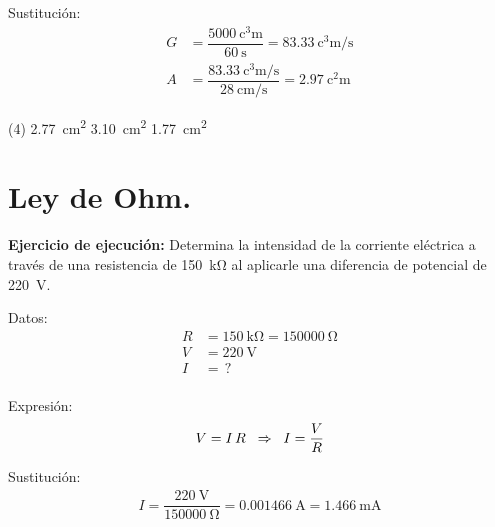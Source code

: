 \documentclass[12pt, letter]{exam}
\begin{document}
\begin{questions}
    Sustitución:
    \begin{align*}
    G &= \dfrac{\SI{5000}{\cubic\centi\meter}}{\SI{60}{\second}} = \SI[per-mode=fraction]{83.33}{\cubic\centi\meter\per\second} \\[0.5em]
    A &= \dfrac{\displaystyle \SI[per-mode=fraction]{83.33}{\cubic\centi\meter\per\second}}{\displaystyle \SI[per-mode=fraction]{28}{\centi\meter\per\second}} = \SI{2.97}{\square\centi\meter}
    \end{align*}
    
    \begin{tasks}(4)
        \task \SI{2.77}{\square\centi\meter}
        \task {}
        \task \SI{3.10}{\square\centi\meter}
        \task \SI{1.77}{\square\centi\meter}
    \end{tasks}

    \setcounter{section}{11}
    \section{Ley de Ohm.}

    \setcounter{question}{27} \question \label{Problema_02} \textbf{Ejercicio de ejecución: } Determina la intensidad de la corriente eléctrica a través de una resistencia de \SI{150}{\kilo\ohm} al aplicarle una diferencia de potencial de \SI{220}{\volt}.

    \begin{minipage}[t]{0.35\linewidth}
    Datos: 
    \begin{align*}
    R &= \SI{150}{\kilo\ohm} = \SI{150000}{\ohm} \\[0.3em]
    V &= \SI{220}{\volt} \\[0.3em]
    I &= \, ? \\
    \end{align*}
    \end{minipage}
    \hspace{1cm}
    \begin{minipage}[t]{0.4\linewidth}
    Expresión:
    \begin{align*}
    V = I \, R \hspace{0.2cm} \Rightarrow \hspace{0.2cm} I = \dfrac{V}{R}
    \end{align*}
    \end{minipage}

    Sustitución:
    \begin{align*}
    I = \dfrac{\SI{220}{\volt}}{\SI{150000}{\ohm}} = \SI{0.001466}{\ampere} = \SI{1.466}{\milli\ampere}
    \end{align*}


\end{questions}
\end{document}
